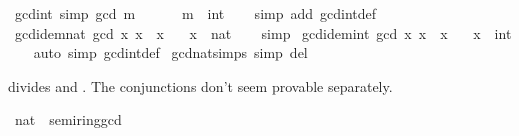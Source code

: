 \begin{isabellebody}
\isamarkupfalse%
\ gcd{\isacharunderscore}{\kern0pt}{}{\isacharunderscore}{\kern0pt}int\ {\isacharbrackleft}{\kern0pt}simp{\isacharbrackright}{\kern0pt}{\isacharcolon}{\kern0pt}\ {\isachardoublequoteopen}gcd\ m\ {}\ {\isacharequal}{\kern0pt}\ {}{\isachardoublequoteclose}\isanewline
\ \ \ m\ {\isacharcolon}{\kern0pt}{\isacharcolon}{\kern0pt}\ int\isanewline
%
\isadelimproof
\ \ %
\endisadelimproof
%
\isatagproof
{}\isamarkupfalse%
\ {\isacharparenleft}{\kern0pt}simp\ add{\isacharcolon}{\kern0pt}\ gcd{\isacharunderscore}{\kern0pt}int{\isacharunderscore}{\kern0pt}def{\isacharparenright}{\kern0pt}%
\endisatagproof
{\isafoldproof}%
%
\isadelimproof
\isanewline
%
\endisadelimproof
\isanewline
{}\isamarkupfalse%
\ gcd{\isacharunderscore}{\kern0pt}idem{\isacharunderscore}{\kern0pt}nat{\isacharcolon}{\kern0pt}\ {\isachardoublequoteopen}gcd\ x\ x\ {\isacharequal}{\kern0pt}\ x{\isachardoublequoteclose}\isanewline
\ \ \ x\ {\isacharcolon}{\kern0pt}{\isacharcolon}{\kern0pt}\ nat\isanewline
%
\isadelimproof
\ \ %
\endisadelimproof
%
\isatagproof
{}\isamarkupfalse%
\ simp%
\endisatagproof
{\isafoldproof}%
%
\isadelimproof
\isanewline
%
\endisadelimproof
\isanewline
{}\isamarkupfalse%
\ gcd{\isacharunderscore}{\kern0pt}idem{\isacharunderscore}{\kern0pt}int{\isacharcolon}{\kern0pt}\ {\isachardoublequoteopen}gcd\ x\ x\ {\isacharequal}{\kern0pt}\ {\isasymbar}x{\isasymbar}{\isachardoublequoteclose}\isanewline
\ \ \ x\ {\isacharcolon}{\kern0pt}{\isacharcolon}{\kern0pt}\ int\isanewline
%
\isadelimproof
\ \ %
\endisadelimproof
%
\isatagproof
{}\isamarkupfalse%
\ {\isacharparenleft}{\kern0pt}auto\ simp{\isacharcolon}{\kern0pt}\ gcd{\isacharunderscore}{\kern0pt}int{\isacharunderscore}{\kern0pt}def{\isacharparenright}{\kern0pt}%
\endisatagproof
{\isafoldproof}%
%
\isadelimproof
\isanewline
%
\endisadelimproof
\isanewline
{}\isamarkupfalse%
\ gcd{\isacharunderscore}{\kern0pt}nat{\isachardot}{\kern0pt}simps\ {\isacharbrackleft}{\kern0pt}simp\ del{\isacharbrackright}{\kern0pt}%
\begin{isamarkuptext}%
\medskip {} divides  and .
  The conjunctions don't seem provable separately.%
\end{isamarkuptext}\isamarkuptrue%
\isamarkupfalse%
\ nat\ {\isacharcolon}{\kern0pt}{\isacharcolon}{\kern0pt}\ semiring{\isacharunderscore}{\kern0pt}gcd\isanewline
%
\isadelimproof
%
\endisadelimproof

\end{isabellebody}
